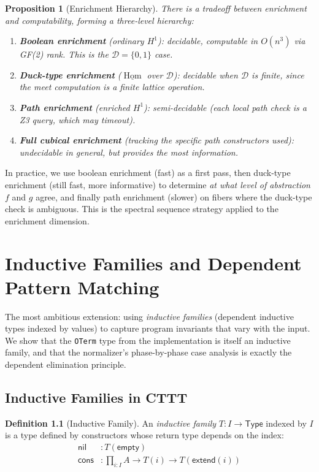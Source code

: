 \documentclass[11pt,a4paper]{report}
\theoremstyle{definition}
\newtheorem{definition}{Definition}[chapter]
\theoremstyle{plain}
\newtheorem{proposition}[definition]{Proposition}
\newcommand{\Type}{\mathsf{Type}}
\newcommand{\Hone}{H^1}
\DeclareMathOperator{\Hom}{Hom}
\begin{document}
\begin{proposition}[Enrichment Hierarchy]
\label{prop:enrichment-hierarchy}
There is a tradeoff between enrichment and computability, forming
a three-level hierarchy:
\begin{enumerate}
  \item \textbf{Boolean enrichment} (ordinary $\Hone$): decidable,
    computable in $O(n^3)$ via GF(2) rank.  This is the
    $\mathcal{D} = \{0,1\}$ case.
  \item \textbf{Duck-type enrichment} ($\underline{\Hom}$ over
    $\mathcal{D}$): decidable when $\mathcal{D}$ is finite, since
    the meet computation is a finite lattice operation.
  \item \textbf{Path enrichment} (enriched $\Hone$): semi-decidable
    (each local path check is a Z3 query, which may timeout).
  \item \textbf{Full cubical enrichment} (tracking the specific
    path constructors used): undecidable in general, but provides
    the most information.
\end{enumerate}
\end{proposition}

In practice, we use boolean enrichment (fast) as a first pass, then
duck-type enrichment (still fast, more informative) to determine
\emph{at what level of abstraction} $f$ and $g$ agree, and finally
path enrichment (slower) on fibers where the duck-type check is
ambiguous.  This is the spectral sequence strategy applied to the
enrichment dimension.


\chapter{Inductive Families and Dependent Pattern Matching}
\label{ch:inductive-families}

The most ambitious extension: using \emph{inductive families} (dependent
inductive types indexed by values) to capture program invariants
that vary with the input.  We show that the \texttt{OTerm} type
from the implementation is itself an inductive family, and that the
normalizer's phase-by-phase case analysis is exactly the dependent
elimination principle.

\section{Inductive Families in CTTT}

\begin{definition}[Inductive Family]
An \emph{inductive family} $T : I \to \Type$ indexed by $I$ is a type
defined by constructors whose return type depends on the index:
\begin{align}
  \mathsf{nil} &: T(\mathsf{empty}) \\
  \mathsf{cons} &: \prod_{i : I} A \to T(i) \to T(\mathsf{extend}(i))
\end{align}
\end{definition}
\end{document}
